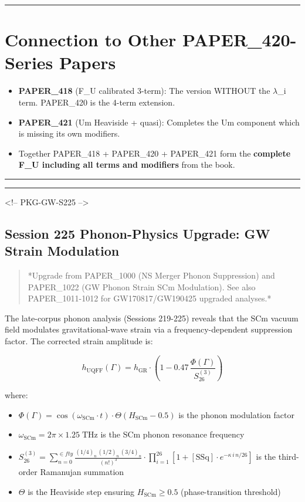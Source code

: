 \documentclass[12pt,a4paper]{article}
\begin{document}
\medskip\hrule\medskip

\section{Connection to Other PAPER\_420-Series Papers}

\begin{itemize}
  \item \textbf{PAPER\_418} (F\_U calibrated 3-term): The version WITHOUT the $\lambda$\_i term. PAPER\_420 is the 4-term extension.
  \item \textbf{PAPER\_421} (Um Heaviside + quasi): Completes the Um component which is missing its own modifiers.
  \item Together PAPER\_418 + PAPER\_420 + PAPER\_421 form the \textbf{complete F\_U including all terms and modifiers} from the book.
\end{itemize}

\medskip\hrule\medskip

\medskip\hrule\medskip

<!-- PKG-GW-S225 -->

\subsection{Session 225 Phonon-Physics Upgrade: GW Strain Modulation}

\begin{quote}
*Upgrade from PAPER\_1000 (NS Merger Phonon Suppression) and PAPER\_1022
(GW Phonon Strain SCm Modulation). See also PAPER\_1011-1012 for
GW170817/GW190425 upgraded analyses.*
\end{quote}

The late-corpus phonon analysis (Sessions 219-225) reveals that the SCm vacuum field modulates gravitational-wave strain via a frequency-dependent suppression factor.  The corrected strain amplitude is:

\begin{equation}
h_{\text{UQFF}}(\Gamma) = h_{\text{GR}} \cdot \left(1 - 0.47\,\frac{\Phi(\Gamma)}{S_{26}^{(3)}}\right)
\end{equation}

where:

\begin{itemize}
  \item $\Phi(\Gamma) = \cos(\omega_{\text{SCm}} \cdot t) \cdot \Theta(H_{\text{SCm}} - 0.5)$ is the phonon modulation factor
  \item $\omega_{\text{SCm}} = 2\pi \times 1.25\;\text{THz}$ is the SCm phonon resonance frequency
  \item $S_{26}^{(3)} = \sum_{n=0}^{\in fty} \frac{(1/4)_n\,(1/2)_n\,(3/4)_n}{(n!)^3} \cdot \prod_{i=1}^{26}\left[1 + [\text{SSq}]\cdot e^{-\kappa\,i\,n/26}\right]$ is the third-order Ramanujan summation
  \item $\Theta$ is the Heaviside step ensuring $H_{\text{SCm}} \geq 0.5$ (phase-transition threshold)
\end{itemize}
\end{document}
